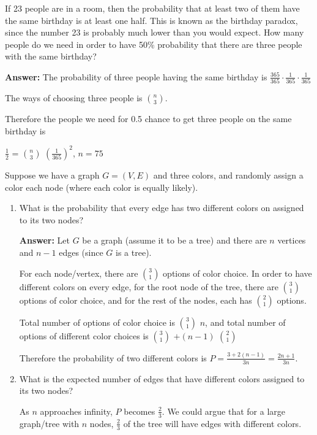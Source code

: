 \documentclass{article}
\author{Group 13: Elliott Pryor, Ben Bushnell, Shengnan Zhou}
\date{due: 18 October 2019}
\begin{document}
\nextprob
If 23 people are in a room, then the probability that at least two of them have
the same birthday is at least one half.  This is known as the birthday paradox,
since the number 23 is probably much lower than you would expect.  How many
people do we need in order to have 50\% probability that there are three people
with the same birthday?


\textbf{Answer: }  The probability of three people having the same birthday is $\frac{365}{365} \cdot \frac{1}{365} \cdot \frac{1}{365}$

The ways of choosing three people is $n\choose{3}$.

Therefore the people we need for 0.5 chance to get three people on the same birthday is 

$\frac{1}{2}$ = $n \choose 3$ $(\frac{1}{365})^2 $, $n = 75$


\nextprob
Suppose we have a graph $G=(V,E)$ and three colors, and randomly assign a color
each node (where each color is equally likely).
\begin{enumerate}
   \item What is the probability that every edge has two different colors on
        assigned to its two nodes?
        
        \textbf{Answer:} Let $G$ be a graph (assume it to be a tree) and there are $n$ vertices and $n-1$ edges (since $G$ is a tree).
        
        For each node/vertex, there are $3 \choose 1$ options of color choice. In order to have different colors on every edge, for the root node of the tree, there are $3 \choose 1$ options of color choice, and for the rest of the nodes, each has $2\choose 1$ options.
        
        Total number of options of color choice is $3\choose 1$ $n$, and total number of options of different color choices is $3\choose 1$ $+ (n-1) $ $2\choose 1$
        
        Therefore the probability of two different colors is $P = \frac{3+2(n-1)}{3n} = \frac{2n+1}{3n}$.
                
    \item What is the expected number of edges that have different colors assigned to its two nodes?
        
        As $n$ approaches infinity, $P$ becomes $\frac{2}{3}$. We could argue that for a large graph/tree with $n$ nodes,  $\frac{2}{3}$ of the tree will have edges with different colors.
        
\end{enumerate}
\end{document}
